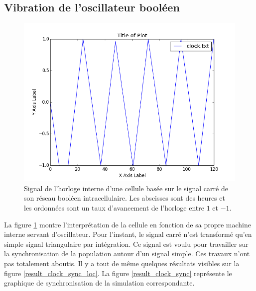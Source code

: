 \documentclass[11pt, a4paper]{article}
\begin{document}
\subsection{Vibration de l'oscillateur booléen}
\begin{figure}[position]
    \begin{center}
        \includegraphics[scale=0.4]{clock}
        \caption{
            \label{result_clock}
            Signal de l'horloge interne d'une cellule basée sur le signal carré
            de son réseau booléen intracellulaire. Les abscisses sont des
            heures et les ordonnées sont un taux d'avancement de l'horloge
            entre $1$ et $-1$.
        }
    \end{center}
\end{figure}

La figure \ref{result_clock} montre l'interprétation de la cellule en fonction
de sa propre machine interne servant d'oscillateur. Pour l'instant, le signal
carré n'est transformé qu'en simple signal triangulaire par intégration. Ce
signal est voulu pour travailler sur la synchronisation de la population autour
d'un signal simple. Ces travaux n'ont pas totalement aboutis. Il y a tout de
même quelques résultats visibles sur la figure \ref{result_clock_sync_loc}. La
figure \ref{result_clock_sync} représente le graphique de synchronisation de la
simulation correspondante.
\end{document}
